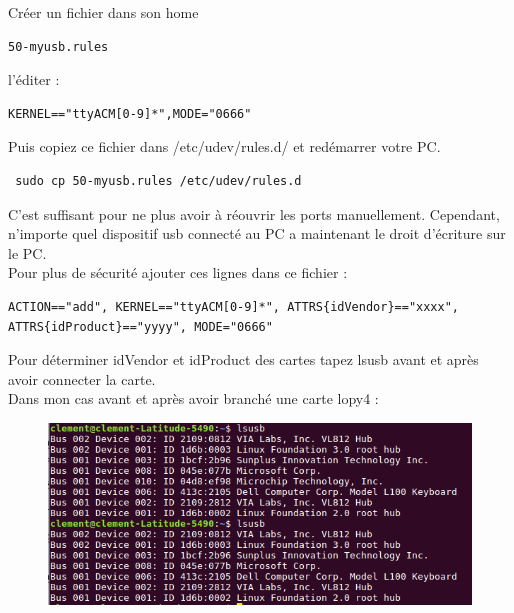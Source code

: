 \documentclass{article}
\begin{document}
Créer un fichier dans son home

\begin{verbatim}
50-myusb.rules
\end{verbatim} 

l'éditer : 

\begin{verbatim}
KERNEL=="ttyACM[0-9]*",MODE="0666"
\end{verbatim}

Puis copiez ce fichier dans /etc/udev/rules.d/ et redémarrer votre PC.

\begin{verbatim}
 sudo cp 50-myusb.rules /etc/udev/rules.d
\end{verbatim}
C'est suffisant pour ne plus avoir à réouvrir les ports manuellement. Cependant, n'importe quel dispositif usb connecté au PC a maintenant le droit d'écriture sur le PC. \\

Pour plus de sécurité ajouter ces lignes dans ce fichier :

\begin{verbatim}
ACTION=="add", KERNEL=="ttyACM[0-9]*", ATTRS{idVendor}=="xxxx", 
ATTRS{idProduct}=="yyyy", MODE="0666"
\end{verbatim}
 
 Pour déterminer idVendor et idProduct des cartes tapez lsusb avant et après avoir connecter la carte. \\

 Dans mon cas avant et après avoir branché une carte lopy4 :
 
 \begin{figure}[H]
\begin{center}
\advance\leftskip-3cm
\advance\rightskip-3cm
\includegraphics[keepaspectratio=true,scale=0.5]{lsusb.png}
\label{visina8}
\end{center}\end{figure}
\end{document}
